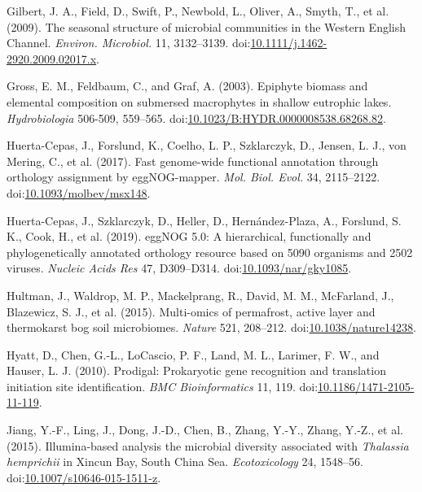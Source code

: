 \documentclass[12pt,]{article}
\begin{document}
\leavevmode\hypertarget{ref-Gilbert2009}{}%
Gilbert, J. A., Field, D., Swift, P., Newbold, L., Oliver, A., Smyth,
T., et al. (2009). The seasonal structure of microbial communities in
the Western English Channel. \emph{Environ. Microbiol.} 11, 3132--3139.
doi:\href{https://doi.org/10.1111/j.1462-2920.2009.02017.x}{10.1111/j.1462-2920.2009.02017.x}.

\leavevmode\hypertarget{ref-Gross2003}{}%
Gross, E. M., Feldbaum, C., and Graf, A. (2003). Epiphyte biomass and
elemental composition on submersed macrophytes in shallow eutrophic
lakes. \emph{Hydrobiologia} 506-509, 559--565.
doi:\href{https://doi.org/10.1023/B:HYDR.0000008538.68268.82}{10.1023/B:HYDR.0000008538.68268.82}.

\leavevmode\hypertarget{ref-Huerta-Cepas2017}{}%
Huerta-Cepas, J., Forslund, K., Coelho, L. P., Szklarczyk, D., Jensen,
L. J., von Mering, C., et al. (2017). Fast genome-wide functional
annotation through orthology assignment by eggNOG-mapper. \emph{Mol.
Biol. Evol.} 34, 2115--2122.
doi:\href{https://doi.org/10.1093/molbev/msx148}{10.1093/molbev/msx148}.

\leavevmode\hypertarget{ref-Huerta-Cepas2019}{}%
Huerta-Cepas, J., Szklarczyk, D., Heller, D., Hernández-Plaza, A.,
Forslund, S. K., Cook, H., et al. (2019). eggNOG 5.0: A hierarchical,
functionally and phylogenetically annotated orthology resource based on
5090 organisms and 2502 viruses. \emph{Nucleic Acids Res} 47,
D309--D314.
doi:\href{https://doi.org/10.1093/nar/gky1085}{10.1093/nar/gky1085}.

\leavevmode\hypertarget{ref-Hultman2015}{}%
Hultman, J., Waldrop, M. P., Mackelprang, R., David, M. M., McFarland,
J., Blazewicz, S. J., et al. (2015). Multi-omics of permafrost, active
layer and thermokarst bog soil microbiomes. \emph{Nature} 521, 208--212.
doi:\href{https://doi.org/10.1038/nature14238}{10.1038/nature14238}.

\leavevmode\hypertarget{ref-Hyatt2010}{}%
Hyatt, D., Chen, G.-L., LoCascio, P. F., Land, M. L., Larimer, F. W.,
and Hauser, L. J. (2010). Prodigal: Prokaryotic gene recognition and
translation initiation site identification. \emph{BMC Bioinformatics}
11, 119.
doi:\href{https://doi.org/10.1186/1471-2105-11-119}{10.1186/1471-2105-11-119}.

\leavevmode\hypertarget{ref-Jiang2015}{}%
Jiang, Y.-F., Ling, J., Dong, J.-D., Chen, B., Zhang, Y.-Y., Zhang,
Y.-Z., et al. (2015). Illumina-based analysis the microbial diversity
associated with \emph{Thalassia hemprichii} in Xincun Bay, South China
Sea. \emph{Ecotoxicology} 24, 1548--56.
doi:\href{https://doi.org/10.1007/s10646-015-1511-z}{10.1007/s10646-015-1511-z}.
\end{document}
